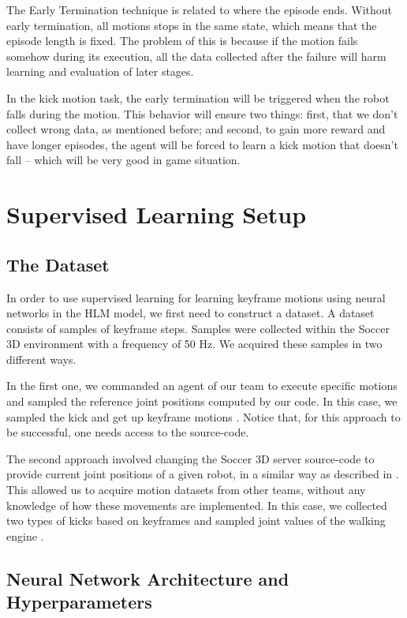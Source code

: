 The Early Termination technique is related to where the episode ends. Without early termination, all motions stops in the same state, which means that the episode length is fixed. The problem of this is because if the motion fails somehow during its execution, all the data collected after the failure will harm learning and evaluation of later stages.

In the kick motion task, the early termination will be triggered when the robot falls during the motion. This behavior will ensure two things: first, that we don't collect wrong data, as mentioned before; and second, to gain more reward and have longer episodes, the agent will be forced to learn a kick motion that doesn't fall -- which will be very good in game situation.



\section{Supervised Learning Setup}\label{supervised_learning_setup}
\subsection{The Dataset}\label{AA}
In order to use supervised learning for learning keyframe motions using neural networks in the HLM model, we first need to construct a dataset. A dataset consists of samples of keyframe steps. Samples were collected within the Soccer 3D environment with a frequency of 50 Hz. We acquired these samples in two different ways.

In the first one, we commanded an agent of our team to execute specific motions and sampled the reference joint positions computed by our code. In this case, we sampled the kick and get up keyframe motions \cite{muniz2016}. Notice that, for this approach to be successful, one needs access to the source-code.

The second approach involved changing the Soccer 3D server source-code to provide current joint positions of a given robot, in a similar way as described in \cite{macalpine2013}. This allowed us to acquire motion datasets from other teams, without any knowledge of how these movements are implemented. In this case, we collected two types of kicks based on keyframes and sampled joint values of the walking engine \cite{AAAI12-MacAlpine}.


\subsection{Neural Network Architecture and Hyperparameters}

